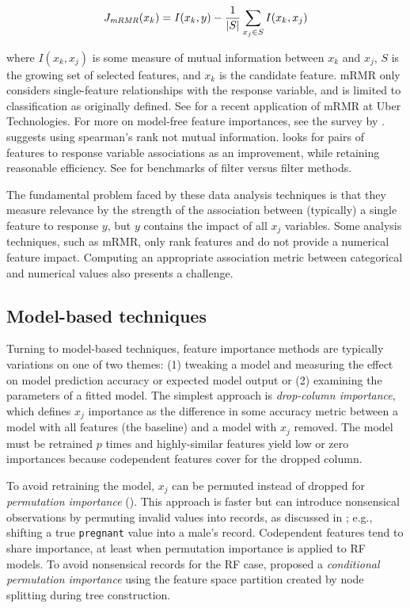 \documentclass[11pt]{article}
\begin{document}
\[
J_{\text{\it mRMR}}(x_k) = I(x_k, y) - \frac{1}{|S|} \sum_{x_j \in S} I(x_k, x_j)
\]

\noindent where $I(x_k, x_j)$ is some measure of mutual information between $x_k$ and $x_j$, $S$ is the growing set of selected features, and $x_k$ is the candidate feature. mRMR only considers single-feature relationships with the response variable, and is limited to classification as originally defined. See \cite{ubermRMR} for a recent application of mRMR at Uber Technologies.  For more on model-free feature importances, see the survey by \cite{survey}.  \citet{tsanas} suggests using spearman's rank not mutual information. \citet{meyer-microarray} looks for pairs of features to response variable associations as an improvement, while retaining reasonable efficiency. See \citet{filter-benchmark} for benchmarks of filter versus filter methods.

The fundamental problem faced by these data analysis techniques is that they measure relevance by the strength of the association between (typically) a single feature to response $y$, but $y$ contains the impact of all $x_j$ variables. Some analysis techniques, such as mRMR, only rank features and do not provide a numerical feature impact. Computing an appropriate association metric between categorical and numerical values also presents a challenge.

\subsection{Model-based techniques}

Turning to model-based techniques, feature importance methods are typically variations on one of two themes:  (1) tweaking a model and measuring the effect on model prediction accuracy or expected model output or (2) examining the parameters of a fitted model. The simplest approach is {\em drop-column importance}, which defines $x_j$ importance as the difference in some accuracy metric between a model with all features (the baseline) and a model with $x_j$ removed. The model must be retrained $p$ times and highly-similar features yield low or zero importances because codependent features cover for the dropped column.

To avoid retraining the model, $x_j$ can be permuted instead of dropped for {\em permutation importance} (\citealt{RF}). This approach is faster but can introduce nonsensical observations by permuting invalid values into records, as discussed in \cite{stopperm}; e.g., shifting a true {\tt\small pregnant} value into a male's record. Codependent features tend to share importance, at least when permutation importance is applied to RF models. To avoid nonsensical records for the RF case, \cite{rfimp} proposed a {\em conditional permutation importance} using the feature space partition created by node splitting during tree construction.  
\end{document}
